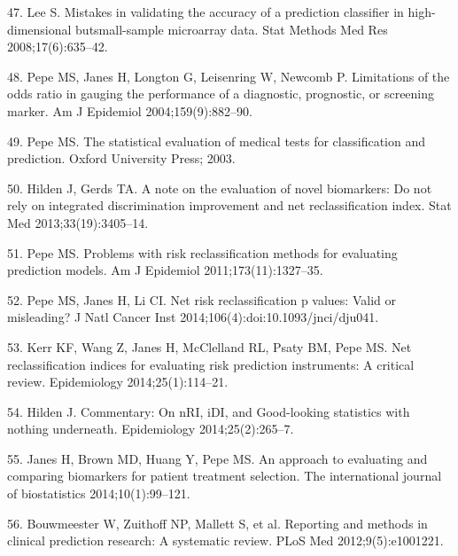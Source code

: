 \documentclass[11pt]{article}
\begin{document}
47. Lee S. Mistakes in validating the accuracy of a prediction
classifier in high-dimensional butsmall-sample microarray data. Stat
Methods Med Res 2008;17(6):635--42.

48. Pepe MS, Janes H, Longton G, Leisenring W, Newcomb P. Limitations of
the odds ratio in gauging the performance of a diagnostic, prognostic,
or screening marker. Am J Epidemiol 2004;159(9):882--90.

49. Pepe MS. The statistical evaluation of medical tests for
classification and prediction. Oxford University Press; 2003.

50. Hilden J, Gerds TA. A note on the evaluation of novel biomarkers: Do
not rely on integrated discrimination improvement and net
reclassification index. Stat Med 2013;33(19):3405--14.

51. Pepe MS. Problems with risk reclassification methods for evaluating
prediction models. Am J Epidemiol 2011;173(11):1327--35.

52. Pepe MS, Janes H, Li CI. Net risk reclassification p values: Valid
or misleading? J Natl Cancer Inst 2014;106(4):doi:10.1093/jnci/dju041.

53. Kerr KF, Wang Z, Janes H, McClelland RL, Psaty BM, Pepe MS. Net
reclassification indices for evaluating risk prediction instruments: A
critical review. Epidemiology 2014;25(1):114--21.

54. Hilden J. Commentary: On nRI, iDI, and Good-looking statistics
with nothing underneath. Epidemiology 2014;25(2):265--7.

55. Janes H, Brown MD, Huang Y, Pepe MS. An approach to evaluating and
comparing biomarkers for patient treatment selection. The international
journal of biostatistics 2014;10(1):99--121.

56. Bouwmeester W, Zuithoff NP, Mallett S, et al. Reporting and methods
in clinical prediction research: A systematic review. PLoS Med
2012;9(5):e1001221.
\end{document}
